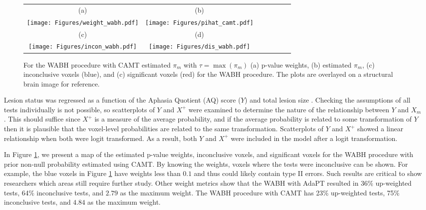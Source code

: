 \documentclass[bimj,fleqn]{w-art}
\theoremstyle{plain}
\theoremstyle{definition}
\begin{document}
\begin{figure}[t]
\centering
\begin{tabular}{ccccccc} 
(a) & (b) \\
\texttt{[image: Figures/weight\_wabh.pdf]} &
\texttt{[image: Figures/pihat\_camt.pdf]} \\
(c) & (d) \\
\texttt{[image: Figures/incon\_wabh.pdf]}&
\texttt{[image: Figures/dis\_wabh.pdf]} \\
\end{tabular}
\caption{For the WABH procedure with CAMT estimated $\pi_m$ with $\tau = \max(\pi_m)$ (a) p-value weights, (b) estimated $\pi_m$, (c) inconclusive voxels (blue), and (c) significant voxels (red) for the WABH procedure.  The plots are overlayed on a structural brain image for reference.}\label{fig.data.weights}
\end{figure}

Lesion status was regressed as a function of the Aphasia Quotient (AQ) score ($Y$) and total lesion size \citep[$X^+$, which is commonly used in VLSM analyses,][]{Roretal07}.  Checking the assumptions of all tests individually is not possible, so scatterplots of $Y$ and $X^+$ were examined to determine the nature of the relationship between $Y$ and $X_{m}$.  This should suffice since $X^+$ is a measure of the average probability, and if the average probability is related to some transformation of $Y$ then it is plausible that the voxel-level probabilities are related to the same transformation. Scatterplots of $Y$ and $X^+$ showed a linear relationship when both were logit transformed. As a result, both $Y$ and $X^+$ were included in the model after a logit transformation.



In Figure \ref{fig.data.weights}, we present a map of the estimated p-value weights, inconclusive voxels, and significant voxels for the WABH procedure with prior non-null probability estimated using CAMT.  By knowing the weights, voxels where the tests were inconclusive can be shown. For example, the blue voxels in Figure \ref{fig.data.weights} have weights less than $0.1$ and thus could likely contain type II errors. Such results are critical to show researchers which areas still require further study. Other weight metrics show that the WABH with AdaPT resulted in 36\% up-weighted tests, 64\% inconclusive tests, and $2.79$ as the maximum weight. The WABH procedure with CAMT has 23\% up-weighted tests, 75\% inconclusive tests, and $4.84$ as the maximum weight. 
\end{document}
